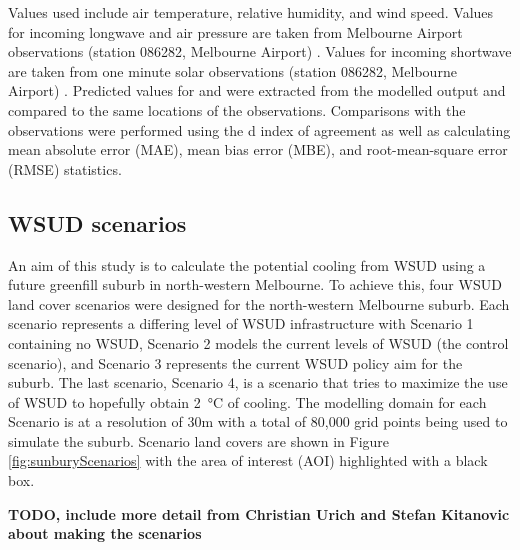 \documentclass[final,3p,times,authoryear]{elsarticle}
\begin{document}
Values used include air temperature, relative humidity, and wind speed. Values for incoming longwave and air pressure are taken from Melbourne Airport observations (station 086282, Melbourne Airport) \citep{BOM2016b}. Values for incoming shortwave are taken from one minute solar observations (station 086282, Melbourne Airport) \citep{BOM2016}. Predicted values for  and  were extracted from the modelled output and compared to the same locations of the observations. Comparisons with the observations were performed using the \cite{Willmott1981} d index of agreement as well as calculating mean absolute error (MAE), mean bias error (MBE), and root-mean-square error (RMSE) statistics.




\subsection{WSUD scenarios}\label{sec:methods_wsudscenarios}
An aim of this study is to calculate the potential cooling from WSUD using a future greenfill suburb in north-western Melbourne. To achieve this, four WSUD land cover scenarios were designed for the north-western Melbourne suburb. Each scenario represents a differing level of WSUD infrastructure with Scenario 1 containing no WSUD, Scenario 2 models the current levels of WSUD (the control scenario), and Scenario 3 represents the current WSUD policy aim for the suburb. The last scenario, Scenario 4, is a scenario that tries to maximize the use of WSUD to hopefully obtain 2\SI{}{\degreeCelsius} of cooling. The modelling domain for each Scenario is at a resolution of 30m with a total of 80,000 grid points being used to simulate the suburb. Scenario land covers are shown in Figure \ref{fig:sunburyScenarios} with the area of interest (AOI) highlighted with a black box. 

\textbf{TODO, include more detail from Christian Urich and Stefan Kitanovic about making the scenarios }
\end{document}

